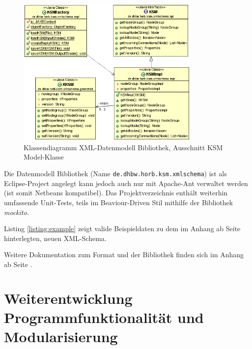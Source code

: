 \documentclass[%
12pt,titlepage,abstracton,DIV=10]{scrreprt}
\begin{document}
\begin{figure}[ht!]
  \centering
\includegraphics[width=0.8\textwidth]{images/class-diagram-xmlschema.PNG}
\caption{Klassendiagramm XML-Datenmodell Bibliothek, Ausschnitt KSM
Model-Klasse}
\label{fig:class-diagram-xmlschema}
\end{figure}

Die Datenmodell Bibliothek (Name \texttt{de.\-dhbw.\-horb.\-ksm.\-xmlschema})
ist als Eclipse-Project angelegt kann jedoch auch nur mit Apache-Ant verwaltet
werden (ist somit Netbeans kompatibel). Das Projektverzeichnis enthält weiterhin
umfassende Unit-Tests, teils im Beaviour-Driven Stil mithilfe der Bibliothek
\textit{mockito}.

Listing \ref{listing:example} zeigt valide Beispieldaten zu dem im Anhang ab
Seite \pageref{listing:schema} hinterlegten, neuen XML-Schema.

\label{listing:example}


Weitere Dokumentation zum Format und der Bibliothek finden sich im Anhang ab
Seite \pageref{chapter:doku-datamodel}.


\chapter{Weiterentwicklung Programmfunktionalität und
Modularisierung}\label{chapter:weiterentwicklung}
\end{document}

